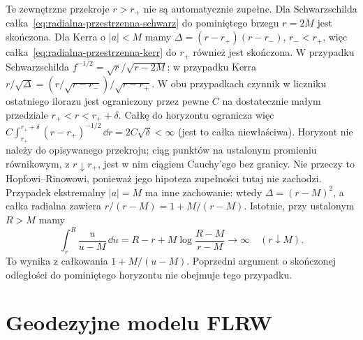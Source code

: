 Te zewnętrzne przekroje $r>r_+$ nie są
automatycznie zupełne. Dla Schwarzschilda
całka~\eqref{eq:radialna-przestrzenna-schwarz}
do pominiętego brzegu $r=2M$ jest skończona.
Dla Kerra o $|a|<M$ mamy
$\Delta=(r-r_+)(r-r_-)$, $r_-<r_+$,
więc całka~\eqref{eq:radialna-przestrzenna-kerr}
do $r_+$ również jest skończona.
W przypadku Schwarzschilda
$f^{-1/2}=\sqrt r/\sqrt{r-2M}$; w przypadku Kerra
$r/\sqrt\Delta=(r/\sqrt{r-r_-})/\sqrt{r-r_+}$.
W obu przypadkach czynnik w liczniku ostatniego ilorazu
jest ograniczony przez pewne $C$ na dostatecznie małym
przedziale $r_+<r<r_++\delta$.
Całkę do horyzontu ogranicza więc
$C\int_{r_+}^{r_++\delta}(r-r_+)^{-1/2}\,\dd r
=2C\sqrt\delta<\infty$ (jest to całka niewłaściwa).
Horyzont nie należy do opisywanego przekroju;
ciąg punktów na ustalonym promieniu równikowym,
z $r\downarrow r_+$, jest w nim ciągiem Cauchy'ego bez granicy. Nie przeczy
to Hopfowi--Rinowowi, ponieważ jego hipoteza
zupełności tutaj nie zachodzi.
Przypadek ekstremalny $|a|=M$ ma inne zachowanie:
wtedy $\Delta=(r-M)^2$, a całka radialna zawiera
$r/(r-M)=1+M/(r-M)$.
Istotnie, przy ustalonym $R>M$ mamy
\[
 \int_r^R\frac{u}{u-M}\,\dd u
 =R-r+M\log\frac{R-M}{r-M}\longrightarrow\infty
 \quad(r\downarrow M).
\]
To wynika z całkowania $1+M/(u-M)$.
Poprzedni argument o skończonej
odległości do pominiętego horyzontu nie obejmuje tego przypadku.

\section{Geodezyjne modelu FLRW}
\label{sec:geodezyjne-minkowski-flrw}

